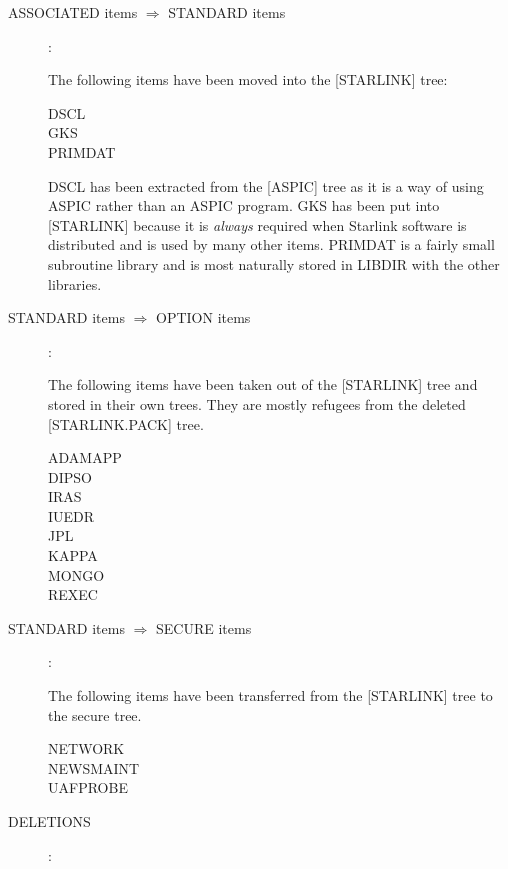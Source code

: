 \begin{description}

\item [ASSOCIATED items $\Longrightarrow$ STANDARD items] :

The following items have been moved into the [STARLINK] tree:

\begin{description}
\item [DSCL]
\item [GKS]
\item [PRIMDAT]
\end{description}
DSCL has been extracted from the [ASPIC] tree as it is a way of using ASPIC
rather than an ASPIC program.
GKS has been put into [STARLINK] because it is {\em always} required when
Starlink software is distributed and is used by many other items.
PRIMDAT is a fairly small subroutine library and is most naturally stored in
LIBDIR with the other libraries.

\item [STANDARD items $\Longrightarrow$ OPTION items] :

The following items have been taken out of the [STARLINK] tree and stored in
their own trees.
They are mostly refugees from the deleted [STARLINK.PACK] tree.
\begin{description}
\item [ADAMAPP]
\item [DIPSO]
\item [IRAS]
\item [IUEDR]
\item [JPL]
\item [KAPPA]
\item [MONGO]
\item [REXEC]
\end{description}

\item [STANDARD items $\Longrightarrow$ SECURE items] :

The following items have been transferred from the [STARLINK] tree to the secure
tree.
\begin{description}
\item [NETWORK]
\item [NEWSMAINT]
\item [UAFPROBE]
\end{description}

\item [DELETIONS] :


\end{description}
